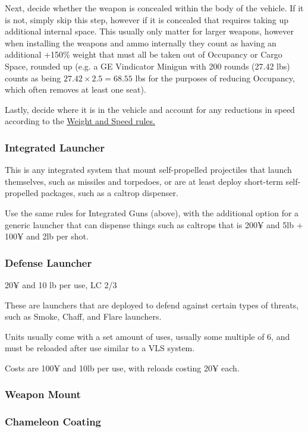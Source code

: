 \begin{multicols*}{2}
	Next, decide whether the weapon is concealed within the body of the vehicle. If it is not, simply skip this step, however if it is concealed that requires taking up additional internal space. This usually only matter for larger weapons, however when installing the weapons and ammo internally they count as having an additional +150\% weight that must all be taken out of Occupancy or Cargo Space, rounded up (e.g. a GE Vindicator Minigun with 200 rounds (27.42 lbs) counts as being $27.42 \times 2.5 = 68.55$ lbs for the purposes of reducing Occupancy, which often removes at least one seat).
	
	Lastly, decide where it is in the vehicle and account for any reductions in speed according to the \hyperref[weight_and_speed]{Weight and Speed rules.}
	
	\subsubsection{Integrated Launcher}
	
	This is any integrated system that mount self-propelled projectiles that launch themselves, such as missiles and torpedoes, or are at least deploy short-term self-propelled packages, such as a caltrop dispenser.
	
	Use the same rules for Integrated Guns (above), with the additional option for a generic launcher that can dispense things such as caltrops that is 200¥ and 5lb + 100¥ and 2lb per shot.
	
	\subsubsection{Defense Launcher}
	20¥ and 10 lb per use, LC 2/3
	
	These are launchers that are deployed to defend against certain types of threats, such as Smoke, Chaff, and Flare launchers.
	
	Units usually come with a set amount of uses, usually some multiple of 6, and must be reloaded after use similar to a VLS system.
	
	Costs are 100¥ and 10lb per use, with reloads costing 20¥ each.
	
	\subsubsection{Weapon Mount}
	
	\subsubsection{Chameleon Coating}
	

\end{multicols*}

